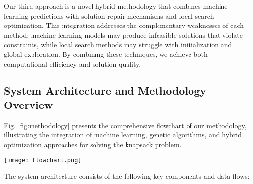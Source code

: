 \documentclass[conference, a4paper]{IEEEtran}
\begin{document}
Our third approach is a novel hybrid methodology that combines machine learning predictions with solution repair mechanisms and local search optimization. This integration addresses the complementary weaknesses of each method: machine learning models may produce infeasible solutions that violate constraints, while local search methods may struggle with initialization and global exploration. By combining these techniques, we achieve both computational efficiency and solution quality.

\subsection{System Architecture and Methodology Overview}

Fig. \ref{fig:methodology} presents the comprehensive flowchart of our methodology, illustrating the integration of machine learning, genetic algorithms, and hybrid optimization approaches for solving the knapsack problem.

\begin{figure*}[htbp]
\centerline{\texttt{[image: flowchart.png]}}
\caption{Methodology flowchart showing the integrated approach to knapsack problem solving. The system combines ML prediction, solution repair, local search optimization and genetic algorithm components.}
\label{fig:methodology}
\end{figure*}

The system architecture consists of the following key components and data flows:
\end{document}
